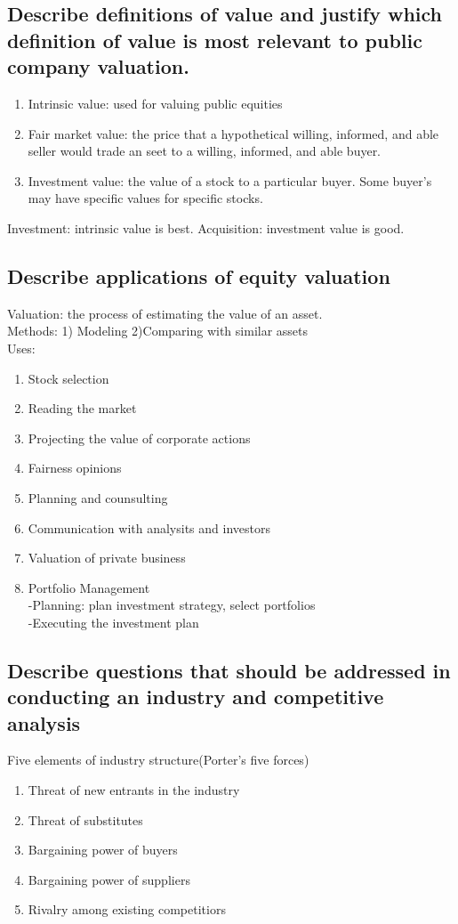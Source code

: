 \documentclass{article}
\newcommand{\be}{\begin{enumerate}}
\newcommand{\ee}{\end{enumerate}}
\begin{document}
\subsection{Describe definitions of value and justify which definition of value
is most relevant to public company valuation.}
\be
    \item Intrinsic value: used for valuing public equities
    \item Fair market value: the price that a hypothetical willing, informed, and able seller
        would trade an seet to a willing, informed, and able buyer.
    \item Investment value: the value of a stock to a particular buyer. Some buyer's 
        may have specific values for specific stocks.
\ee
Investment: intrinsic value is best.
Acquisition: investment value is good.
\subsection{Describe applications of equity valuation}
Valuation: the process of estimating the value of an asset.
\\Methods: 1) Modeling 2)Comparing with similar assets
\\Uses:
\be
    \item Stock selection
    \item Reading the market
    \item Projecting the value of corporate actions
    \item Fairness opinions
    \item Planning and counsulting
    \item Communication with analysits and investors
    \item Valuation of private business
    \item Portfolio Management
        \\-Planning: plan investment strategy, select portfolios
        \\-Executing the investment plan
\ee
\subsection{Describe questions that should be addressed in conducting an industry
and competitive analysis}
Five elements of industry structure(Porter's five forces)
\be
    \item Threat of new entrants in the industry
    \item Threat of substitutes
    \item Bargaining power of buyers
    \item Bargaining power of suppliers
    \item Rivalry among existing competitiors
\ee
\end{document}
